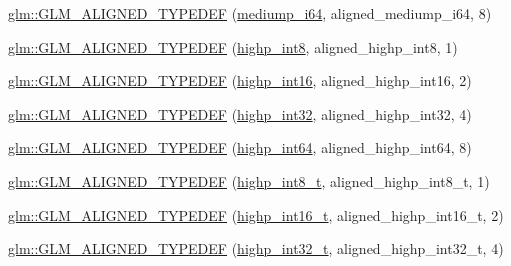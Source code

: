 \begin{DoxyCompactItemize}
\item 
\hyperlink{group__gtx__type__aligned_ga8b20507bb048c1edea2d441cc953e6f0}{glm\+::\+G\+L\+M\+\_\+\+A\+L\+I\+G\+N\+E\+D\+\_\+\+T\+Y\+P\+E\+D\+EF} (\hyperlink{group__gtc__type__precision_ga90fedf6c701ffbe00535156715e50787}{mediump\+\_\+i64}, aligned\+\_\+mediump\+\_\+i64, 8)
\item 
\hyperlink{group__gtx__type__aligned_ga56c5ca60813027b603c7b61425a0479d}{glm\+::\+G\+L\+M\+\_\+\+A\+L\+I\+G\+N\+E\+D\+\_\+\+T\+Y\+P\+E\+D\+EF} (\hyperlink{group__gtc__type__precision_ga57c86999e666760c304453f9bfdc09d1}{highp\+\_\+int8}, aligned\+\_\+highp\+\_\+int8, 1)
\item 
\hyperlink{group__gtx__type__aligned_ga7a751b3aff24c0259f4a7357c2969089}{glm\+::\+G\+L\+M\+\_\+\+A\+L\+I\+G\+N\+E\+D\+\_\+\+T\+Y\+P\+E\+D\+EF} (\hyperlink{group__gtc__type__precision_gaf0430ed80e88c0d1dfbe47f359659c81}{highp\+\_\+int16}, aligned\+\_\+highp\+\_\+int16, 2)
\item 
\hyperlink{group__gtx__type__aligned_ga70cd2144351c556469ee6119e59971fc}{glm\+::\+G\+L\+M\+\_\+\+A\+L\+I\+G\+N\+E\+D\+\_\+\+T\+Y\+P\+E\+D\+EF} (\hyperlink{group__gtc__type__precision_gaa2045c92b9553d463191af6a20e997bb}{highp\+\_\+int32}, aligned\+\_\+highp\+\_\+int32, 4)
\item 
\hyperlink{group__gtx__type__aligned_ga46bbf08dc004d8c433041e0b5018a5d3}{glm\+::\+G\+L\+M\+\_\+\+A\+L\+I\+G\+N\+E\+D\+\_\+\+T\+Y\+P\+E\+D\+EF} (\hyperlink{group__gtc__type__precision_ga7ffb27943e9569800979081bc548621c}{highp\+\_\+int64}, aligned\+\_\+highp\+\_\+int64, 8)
\item 
\hyperlink{group__gtx__type__aligned_gab3e10c77a20d1abad2de1c561c7a5c18}{glm\+::\+G\+L\+M\+\_\+\+A\+L\+I\+G\+N\+E\+D\+\_\+\+T\+Y\+P\+E\+D\+EF} (\hyperlink{group__gtc__type__precision_ga417701b99e6e7992f35ab2ef694f88b2}{highp\+\_\+int8\+\_\+t}, aligned\+\_\+highp\+\_\+int8\+\_\+t, 1)
\item 
\hyperlink{group__gtx__type__aligned_ga968f30319ebeaca9ebcd3a25a8e139fb}{glm\+::\+G\+L\+M\+\_\+\+A\+L\+I\+G\+N\+E\+D\+\_\+\+T\+Y\+P\+E\+D\+EF} (\hyperlink{group__gtc__type__precision_ga07d318d61472e75238e53b9642227672}{highp\+\_\+int16\+\_\+t}, aligned\+\_\+highp\+\_\+int16\+\_\+t, 2)
\item 
\hyperlink{group__gtx__type__aligned_gaae773c28e6390c6aa76f5b678b7098a3}{glm\+::\+G\+L\+M\+\_\+\+A\+L\+I\+G\+N\+E\+D\+\_\+\+T\+Y\+P\+E\+D\+EF} (\hyperlink{group__gtc__type__precision_ga783d077a513c1f475f6cdb406b4238c3}{highp\+\_\+int32\+\_\+t}, aligned\+\_\+highp\+\_\+int32\+\_\+t, 4)
\item 

\end{DoxyCompactItemize}
